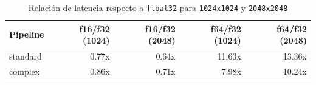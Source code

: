 \begin{table}[h!]
\centering
\renewcommand{\arraystretch}{1.2}
\setlength{\tabcolsep}{7pt}
\begin{tabular}{|l|r|r|r|r|}
\hline
\rowcolor[gray]{0.90}
\textbf{Pipeline} & \textbf{f16/f32 (1024)} & \textbf{f16/f32 (2048)} & \textbf{f64/f32 (1024)} & \textbf{f64/f32 (2048)} \\
\hline
standard & 0.77x & 0.64x & 11.63x & 13.36x \\
\hline
complex & 0.86x & 0.71x & 7.98x & 10.24x \\
\hline
\end{tabular}
\caption{Relación de latencia respecto a \texttt{float32} para \texttt{1024x1024} y \texttt{2048x2048}}
\label{tab:dtype_consistency_1024_2048_equipo1}
\end{table}
